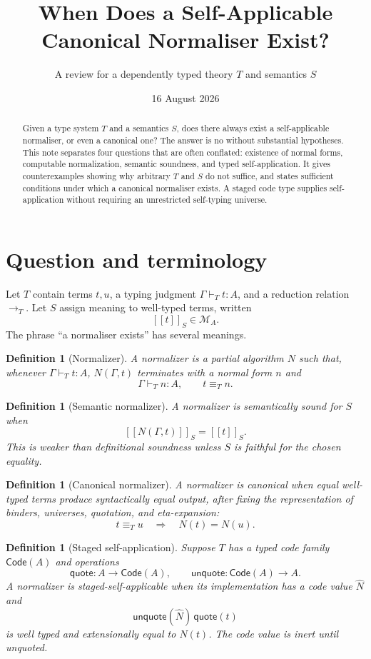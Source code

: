 \documentclass[11pt,a4paper]{article}
\title{When Does a Self-Applicable Canonical Normaliser Exist?}
\author{A review for a dependently typed theory $T$ and semantics $S$}
\date{16 August 2026}
\newtheorem{definition}[theorem]{Definition}
\newcommand{\Code}{\mathsf{Code}}
\newcommand{\llbracket}{[\![}
\newcommand{\rrbracket}{]\!]}
\begin{document}
\maketitle
\begin{abstract}
Given a type system $T$ and a semantics $S$, does there always exist a self-applicable normaliser, or even a canonical one? The answer is no without substantial hypotheses. This note separates four questions that are often conflated: existence of normal forms, computable normalization, semantic soundness, and typed self-application. It gives counterexamples showing why arbitrary $T$ and $S$ do not suffice, and states sufficient conditions under which a canonical normaliser exists. A staged code type supplies self-application without requiring an unrestricted self-typing universe.
\end{abstract}
\tableofcontents

\section{Question and terminology}
Let $T$ contain terms $t,u$, a typing judgment $\Gamma\vdash_T t:A$, and a reduction relation $\to_T$. Let $S$ assign meaning to well-typed terms, written
\[
\llbracket t\rrbracket_S \in \mathcal{M}_A.
\]
The phrase ``a normaliser exists'' has several meanings.

\begin{definition}[Normalizer]
A normalizer is a partial algorithm $N$ such that, whenever $\Gamma\vdash_T t:A$, $N(\Gamma,t)$ terminates with a normal form $n$ and
\[
\Gamma\vdash_T n:A,\qquad t\equiv_T n.
\]
\end{definition}

\begin{definition}[Semantic normalizer]
A normalizer is semantically sound for $S$ when
\[
\llbracket N(\Gamma,t)\rrbracket_S=\llbracket t\rrbracket_S.
\]
This is weaker than definitional soundness unless $S$ is faithful for the chosen equality.
\end{definition}

\begin{definition}[Canonical normalizer]
A normalizer is canonical when equal well-typed terms produce syntactically equal output, after fixing the representation of binders, universes, quotation, and eta-expansion:
\[
t\equiv_T u\quad\Longrightarrow\quad N(t)=N(u).
\]
\end{definition}

\begin{definition}[Staged self-application]
Suppose $T$ has a typed code family $\Code(A)$ and operations
\[
\mathsf{quote}:A\to\Code(A),\qquad \mathsf{unquote}:\Code(A)\to A.
\]
A normalizer is staged-self-applicable when its implementation has a code value $\widehat N$ and
\[
\mathsf{unquote}(\widehat N)\,\mathsf{quote}(t)
\]
is well typed and extensionally equal to $N(t)$. The code value is inert until unquoted.
\end{definition}
\end{document}
